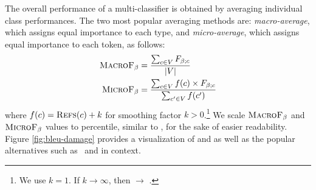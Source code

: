 The overall performance of a multi-classifier is obtained by averaging individual class performances. The two most popular averaging methods are: \textit{macro-average}, which assigns equal importance to each type, and \textit{micro-average}, which assigns equal importance to each token, as follows:  
\begin{align*}
\textsc{MacroF}{\text{$_{{\beta}}$}} &= \frac{\sum_{c \in V} F_{\beta;c}} {|V|}\\
\textsc{MicroF}{\text{$_{{\beta}}$}} &= \frac{\sum_{c\in V} f(c) \times F_{\beta;c}} {\sum_{c'\in V} f(c')}
\end{align*}
\noindent where $f(c) = \textsc{Refs}(c)+k$ for smoothing factor $k > 0$.\footnote{We use $k=1$. If $k\rightarrow \infty$, then  $\rightarrow$ .} We scale $\textsc{MacroF}{\text{$_{{\beta}}$}}$ and $\textsc{MicroF}{\text{$_{{\beta}}$}}$ values to percentile, similar to \bleu, for the sake of easier readability.  Figure \ref{fig:bleu-damage} provides a visualization of  and  as well as the popular alternatives such as \bleu\ and  in context.
